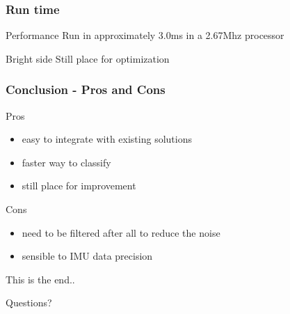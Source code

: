 \documentclass{beamer}
\begin{document}
	\begin{frame}
		\frametitle{Run time}

		\begin{alertblock}{Performance}
			Run in approximately 3.0ms in a 2.67Mhz processor
		\end{alertblock}		
		
		\begin{exampleblock}{Bright side}
			Still place for optimization
		\end{exampleblock}				
		
	\end{frame}	

	\begin{frame}
		\frametitle{Conclusion - Pros and Cons}
		
		\begin{block}{Pros}
			\begin{itemize}
			\item easy to integrate with existing solutions
			\item faster way to classify
			\item still place for improvement
			\end{itemize}
		\end{block}		
		
		\begin{block}{Cons}
			\begin{itemize}
			\item need to be filtered after all to reduce the noise
			\item sensible to IMU data precision
			\end{itemize}
		\end{block}
		
	\end{frame}

%			
%
%

	\begin{frame}{This is the end..}
	\begin{alertblock}{}
		\center
		Questions?
	\end{alertblock}
	\end{frame} 	
 	


{} 	
\end{document}
